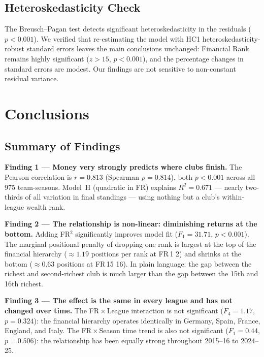 \documentclass[11pt, a4paper]{article}
\begin{document}
\subsection{Heteroskedasticity Check}

The Breusch--Pagan test detects significant heteroskedasticity in the residuals
($p < 0.001$). We verified that re-estimating the model with HC1
heteroskedasticity-robust standard errors leaves the main conclusions unchanged:
Financial Rank remains highly significant ($z > 15$, $p < 0.001$), and the
percentage changes in standard errors are modest. Our findings are not sensitive
to non-constant residual variance.

\section{Conclusions}

\subsection{Summary of Findings}

\begin{findingbox}
  \textbf{Finding 1 --- Money very strongly predicts where clubs finish.}
  The Pearson correlation is $r = 0.813$ (Spearman $\rho = 0.814$), both
  $p < 0.001$ across all 975 team-seasons. Model~H (quadratic in FR)
  explains $R^{2} = 0.671$ --- nearly two-thirds of all variation in final
  standings --- using nothing but a club's within-league wealth rank.
\end{findingbox}

\begin{findingbox}
  \textbf{Finding 2 --- The relationship is non-linear: diminishing returns at the bottom.}
  Adding FR$^2$ significantly improves model fit ($F_{1} = 31.71$, $p < 0.001$).
  The marginal positional penalty of dropping one rank is largest at the top of
  the financial hierarchy ($\approx 1.19$ positions per rank at FR\,1\,\textrightarrow\,2)
  and shrinks at the bottom ($\approx 0.63$ positions at FR\,15\,\textrightarrow\,16).
  In plain language: the gap between the richest and second-richest club is much
  larger than the gap between the 15th and 16th richest.
\end{findingbox}

\begin{findingbox}
  \textbf{Finding 3 --- The effect is the same in every league and has not changed over time.}
  The FR\,$\times$\,League interaction is not significant ($F_{4} = 1.17$,
  $p = 0.324$): the financial hierarchy operates identically in Germany, Spain,
  France, England, and Italy. The FR\,$\times$\,Season time trend is also not
  significant ($F_{1} = 0.44$, $p = 0.506$): the relationship has been equally
  strong throughout 2015--16 to 2024--25.
\end{findingbox}
\end{document}
